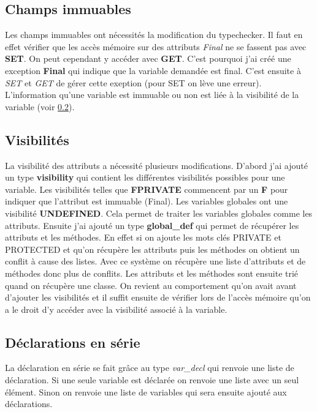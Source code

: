 \documentclass{article}
\begin{document}
\subsection{Champs immuables}
Les champs immuables ont nécessités la modification du typechecker. Il faut en effet vérifier que les accès mémoire 
sur des attributs \textit{Final} ne se fassent pas avec \textbf{SET}. On peut cependant y accéder avec \textbf{GET}.
C'est pourquoi j'ai créé une exception \textbf{Final} qui indique que la variable demandée est final. C'est ensuite 
à \textit{SET} et \textit{GET} de gérer cette exeption (pour SET on lève une erreur).
L'information qu'une variable est immuable ou non est liée à la visibilité de la variable (voir \ref{visib}).

\subsection{Visibilités}
\label{visib}
La visibilité des attributs a nécessité plusieurs modifications. D'abord j'ai ajouté un type \textbf{visibility} 
qui contient les différentes visibilités possibles pour une variable. Les visibilités telles que \textbf{FPRIVATE} 
commencent par un \textbf{F} pour indiquer que l'attribut est immuable (Final). Les variables globales ont une 
visibilité \textbf{UNDEFINED}. Cela permet de traiter les variables globales comme les attributs.
Ensuite j'ai ajouté un type \textbf{global\_def} qui permet de récupérer les attributs et les méthodes. En effet si 
on ajoute les mots clés PRIVATE et PROTECTED et qu'on récupère les attributs puis les méthodes on obtient un conflit 
à cause des listes. Avec ce système on récupère une liste d'attributs et de méthodes donc plus de conflits.
Les attributs et les méthodes sont ensuite trié quand on récupère une classe. On revient au comportement qu'on 
avait avant d'ajouter les visibilités et il suffit ensuite de vérifier lors de l'accès mémoire qu'on a le droit 
d'y accéder avec la visibilité associé à la variable.

\subsection{Déclarations en série}
La déclaration en série se fait grâce au type \textit{var\_decl} qui renvoie une liste de déclaration. Si une 
seule variable est déclarée on renvoie une liste avec un seul élément. Sinon on renvoie une liste de variables 
qui sera ensuite ajouté aux déclarations.
\end{document}
